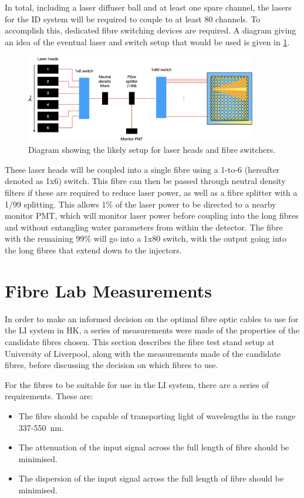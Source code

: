 \documentclass[a4paper,11pt]{article}
\begin{document}
In total, including a laser diffuser ball and at least one spare channel, the lasers for the ID system will be required to couple to at least 80 channels. To accomplish this, dedicated fibre switching devices are required. A diagram giving an idea of the eventual laser and switch setup that would be used is given in \cref{fig:laserswitches}.
\begin{figure}[h]
\centering
\includegraphics[width=0.9\textwidth]{switchConfiguration}
\caption{Diagram showing the likely setup for laser heads and fibre switchers.}\label{fig:laserswitches}
\end{figure}
These laser heads will be coupled into a single fibre using a 1-to-6 (hereafter denoted as 1x6) switch. This fibre can then be passed through neutral density filters if these are required to reduce laser power, as well as a fibre splitter with a 1/99 splitting. This allows 1\% of the laser power to be directed to a nearby monitor PMT, which will monitor laser power before coupling into the long fibres and without entangling water parameters from within the detector. The fibre with the remaining 99\% will go into a 1x80 switch, with the output going into the long fibres that extend down to the injectors.


\section{Fibre Lab Measurements}

In order to make an informed decision on the optimal fibre optic cables to use for the LI system in HK, a series of measurements were made of the properties of the candidate fibres chosen. This section describes the fibre test stand setup at University of Liverpool, along with the measurements made of the candidate fibres, before discussing the decision on which fibres to use.

For the fibres to be suitable for use in the LI system, there are a series of requirements. These are:
\begin{itemize}
\item The fibre should be capable of transporting light of wavelengths in the range 337-550~nm.
\item The attenuation of the input signal across the full length of fibre should be minimised.
\item The dispersion of the input signal across the full length of fibre should be minimised.
\end{itemize}
\end{document}
